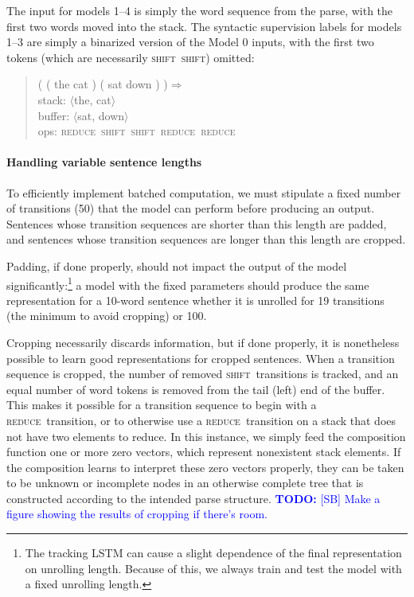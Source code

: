 \documentclass[11pt,letterpaper]{article}
\newcommand\todo[1]{\textcolor{blue}{\textbf{TODO:} #1}}
\newcommand{\shift}{\textsc{shift}}
\newcommand{\reduce}{\textsc{reduce}}
\begin{document}
The input for models 1--4 is simply the word sequence from the parse, with the first two words moved into the stack. The syntactic supervision labels for models 1--3 are simply a binarized version of the Model 0 inputs, with the first two tokens (which are necessarily \shift~\shift) omitted: 

\begin{quote}\small
( ( the cat ) ( sat down ) )$\Rightarrow$ \\
stack: $\langle$the, cat$\rangle$\\
buffer: $\langle$sat, down$\rangle$\\
ops: \reduce~\shift~\shift~\reduce~\reduce
\end{quote}

\paragraph{Handling variable sentence lengths}

To efficiently implement batched computation, we must stipulate a fixed number of transitions (50) that the model can perform before producing an output. Sentences whose transition sequences are shorter than this length are padded, and sentences whose transition sequences are longer than this length are cropped. 

Padding, if done properly, should not impact the output of the model significantly:\footnote{The tracking LSTM can cause a slight dependence of the final representation on unrolling length. Because of this, we always train and test the model with a fixed unrolling length.} a model with the fixed parameters should produce the same representation for a 10-word sentence whether it is unrolled for 19 transitions (the minimum to avoid cropping) or 100.

Cropping necessarily discards information, but if done properly, it is nonetheless possible to learn good representations for cropped sentences. When a transition sequence is cropped, the number of removed \shift~transitions is tracked, and an equal number of word tokens is removed from the tail (left) end of the buffer. This makes it possible for a transition sequence to begin with a \reduce~transition, or to otherwise use a \reduce~transition on a stack that does not have two elements to reduce. In this instance, we simply feed the composition function one or more zero vectors, which represent nonexistent stack elements. If the composition learns to interpret these zero vectors properly, they can be taken to be unknown or incomplete nodes in an otherwise complete tree that is constructed according to the intended parse structure. \todo{[SB] Make a figure showing the results of cropping if there's room.}
\end{document}
